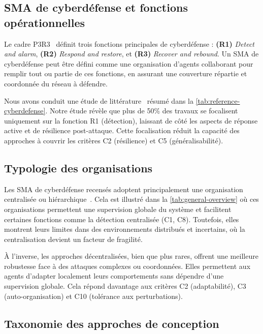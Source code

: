 \subsection*{SMA de cyberdéfense et fonctions opérationnelles}

Le cadre P3R3~\cite{theron_p3r3_2021} définit trois fonctions principales de cyberdéfense : \textbf{(R1)} \textit{Detect and alarm}, \textbf{(R2)} \textit{Respond and restore}, et \textbf{(R3)} \textit{Recover and rebound}. Un \ac{SMA} de cyberdéfense peut être défini comme une organisation d'agents collaborant pour remplir tout ou partie de ces fonctions, en assurant une couverture répartie et coordonnée du réseau à défendre.

Nous avons conduit une étude de littérature~\cite{soule2023rjciathese} résumé dans la \autoref{tab:reference-cyberdefense}. Notre étude révèle que plus de 50\% des travaux se focalisent uniquement sur la fonction R1 (détection), laissant de côté les aspects de réponse active et de résilience post-attaque. Cette focalisation réduit la capacité des approches à couvrir les critères C2 (résilience) et C5 (généralisabilité).



\subsection*{Typologie des organisations}

Les \ac{SMA} de cyberdéfense recensés adoptent principalement une organisation centralisée ou hiérarchique~\cite{soule2023ressithese}. Cela est illustré dans la \autoref{tab:general-overview} où ces organisations permettent une supervision globale du système et facilitent certaines fonctions comme la détection centralisée (C1, C8). Toutefois, elles montrent leurs limites dans des environnements distribués et incertains, où la centralisation devient un facteur de fragilité.

À l'inverse, les approches décentralisées, bien que plus rares, offrent une meilleure robustesse face à des attaques complexes ou coordonnées. Elles permettent aux agents d'adapter localement leurs comportements sans dépendre d'une supervision globale. Cela répond davantage aux critères C2 (adaptabilité), C3 (auto-organisation) et C10 (tolérance aux perturbations).



\subsection*{Taxonomie des approches de conception}

